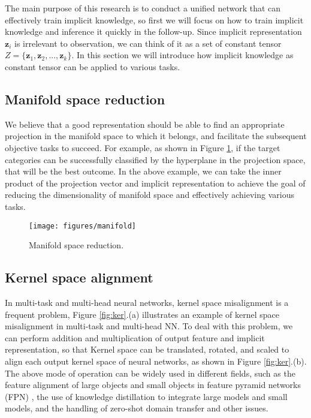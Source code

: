 \documentclass[10pt,twocolumn,letterpaper]{article}
\begin{document}
The main purpose of this research is to conduct a unified network that can effectively train implicit knowledge, so first we will focus on how to train implicit knowledge and inference it quickly in the follow-up. Since implicit representation $\mathbf{z}_{i}$ is irrelevant to observation, we can think of it as a set of constant tensor $Z = \{\mathbf{z}_{1}, \mathbf{z}_{2}, ..., \mathbf{z}_{k}\}$. In this section we will introduce how implicit knowledge as constant tensor can be applied to various tasks.

\subsection{Manifold space reduction}

We believe that a good representation should be able to find an appropriate projection in the manifold space to which it belongs, and facilitate the subsequent objective tasks to succeed. For example, as shown in Figure \ref{fig:mani}, if the target categories can be successfully classified by the hyperplane in the projection space, that will be the best outcome. In the above example, we can take the inner product of the projection vector and implicit representation to achieve the goal of reducing the dimensionality of manifold space and effectively achieving various tasks.

\begin{figure}[h]
	\begin{center}
		\texttt{[image: figures/manifold]}
	\end{center}
	\caption{Manifold space reduction.}
	\label{fig:mani}
\end{figure}

\subsection{Kernel space alignment}

In multi-task and multi-head neural networks, kernel space misalignment is a frequent problem, Figure \ref{fig:ker}.(a) illustrates an example of kernel space misalignment in multi-task and multi-head NN. To deal with this problem, we can perform addition and multiplication of output feature and implicit representation, so that Kernel space can be translated, rotated, and scaled to align each output kernel space of neural networks, as shown in Figure \ref{fig:ker}.(b). The above mode of operation can be widely used in different fields, such as the feature alignment of large objects and small objects in feature pyramid networks (FPN) \cite{lin2017feature}, the use of knowledge distillation to integrate large models and small models, and the handling of zero-shot domain transfer and other issues.
\end{document}
